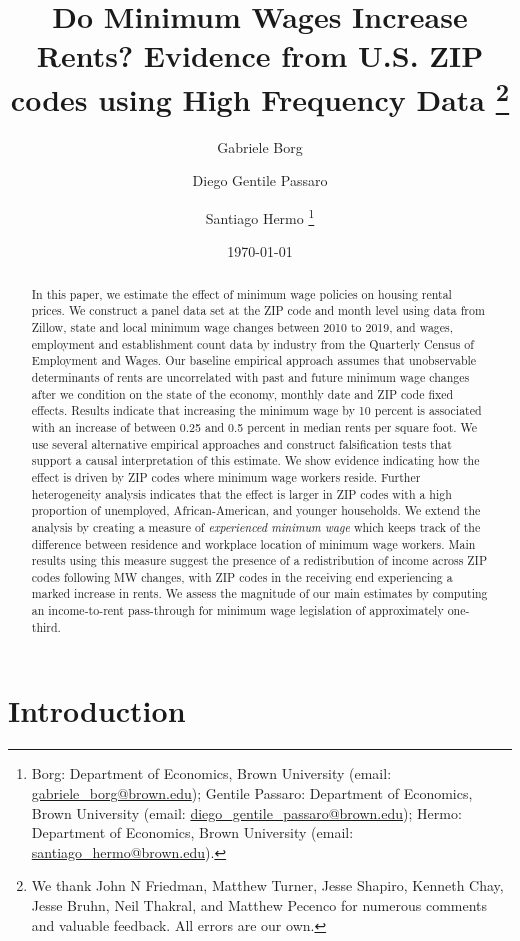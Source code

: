 \documentclass{article}
\title{Do Minimum Wages Increase Rents? 
	   Evidence from U.S. ZIP codes using High Frequency Data 
	   \thanks{We thank John N Friedman, Matthew Turner, Jesse Shapiro, Kenneth Chay, 
	   	Jesse Bruhn, Neil Thakral, and Matthew Pecenco for numerous comments and 
	   	valuable feedback. All errors are our own.}}
\author{Gabriele Borg \and Diego Gentile Passaro \and Santiago Hermo
		\footnote{Borg: Department of Economics, Brown University (email: 
		\url{gabriele_borg@brown.edu}); 
		Gentile Passaro: Department of Economics, Brown University (email: 
		\url{diego_gentile_passaro@brown.edu}); 
		Hermo: Department of Economics, Brown University (email: 
		\url{santiago_hermo@brown.edu}).}
		}
\date{\today}
\begin{document}
\maketitle

\begin{abstract}
    \noindent
    In this paper, we estimate the effect of minimum wage policies on housing rental 
    prices. We construct a panel data set at the ZIP code and month level using data 
    from Zillow, state and local minimum wage changes between 2010 to 2019, and wages, 
    employment and establishment count data by industry from the Quarterly Census of 
    Employment and Wages. Our baseline empirical approach assumes that unobservable 
    determinants of rents are uncorrelated with past and future minimum wage changes 
    after we condition on the state of the economy, monthly date and ZIP code fixed 
    effects. Results indicate that increasing the minimum wage by 10 percent is 
    associated with an increase of between 0.25 and 0.5 percent in median rents per 
    square foot. We use several alternative empirical approaches and construct 
    falsification tests that support a causal interpretation of this estimate. We show 
    evidence indicating how the effect is driven by ZIP codes where minimum wage workers 
    reside. Further heterogeneity analysis indicates that the effect is larger in ZIP 
    codes with a high proportion of unemployed, African-American, and younger households. 
    We extend the analysis by creating a measure of \textit{experienced minimum wage} 
    which keeps track of the difference between residence and workplace location of 
    minimum wage workers. Main results using this measure suggest the presence of a 
    redistribution of income across ZIP codes following MW changes, with ZIP codes in
    the receiving end experiencing a marked increase in rents. We assess the magnitude
    of our main estimates by computing an income-to-rent pass-through for minimum wage 
    legislation of approximately one-third. 
\end{abstract}

\vspace{5mm}

\maketitle


\clearpage

\section{Introduction}\label{sec:intro}
    
\end{document}

